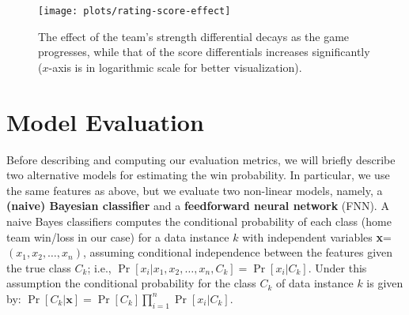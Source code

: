 \documentclass{sig-alternate}
\begin{document}
\begin{figure}[t]
\begin{center}
\texttt{[image: plots/rating-score-effect]}%
 \caption{The effect of the team's strength differential decays as the game progresses, while that of the score differentials increases significantly ($x$-axis is in logarithmic scale for better visualization).}
 \label{fig:rtg-effect}
\end{center}
\end{figure}

\section{Model Evaluation}
\label{sec:evaluation}

Before describing and computing our evaluation metrics, we will briefly describe two alternative models for estimating the win probability. 
In particular, we use the same features as above, but we evaluate two non-linear models, namely, a {\bf (naive) Bayesian classifier} and a {\bf feedforward neural network} (FNN). 
A naive Bayes classifiers computes the conditional probability of each class (home team win/loss in our case) for a data instance $k$ with independent variables {\bf x}=$(x_1,x_2,\dots,x_n)$, assuming conditional independence between the features given the true class $C_k$; i.e., $\Pr[x_i | x_1,x_2,\dots,x_n,C_k] = \Pr[x_i | C_k]$.  
Under this assumption the conditional probability for the class $C_k$ of data instance $k$ is given by: $\Pr[C_k | \mathbf{x}] = \Pr[C_k] \prod_{i=1}^n \Pr[x_i|C_k]$. 

\def\layersep{2.5cm}

\def\layerseptwo{5cm}
\end{document}
